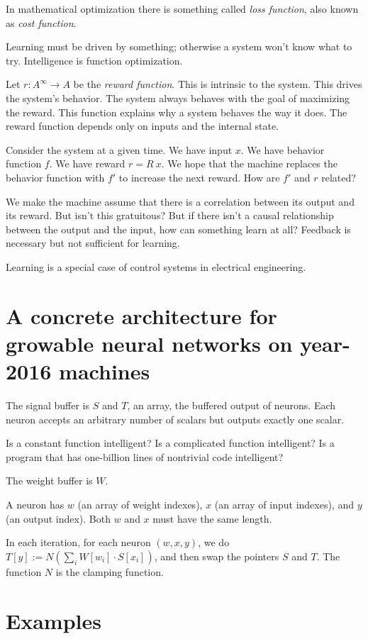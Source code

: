 In mathematical optimization there is something called
\emph{loss function}, also known as \emph{cost function}.

Learning must be driven by something;
otherwise a system won't know what to try.
Intelligence is function optimization.

Let \( r : A^\infty \to A \) be the \emph{reward function}.
This is intrinsic to the system.
This drives the system's behavior.
The system always behaves with the goal of maximizing the reward.
This function explains why a system behaves the way it does.
The reward function depends only on inputs and the internal state.

Consider the system at a given time.
We have input \(x\).
We have behavior function \(f\).
We have reward \(r = R~x\).
We hope that the machine
replaces the behavior function with \(f'\)
to increase the next reward.
How are \(f'\) and \(r\) related?

We make the machine assume that there is a correlation
between its output and its reward.
But isn't this gratuitous?
But if there isn't a causal relationship between the output and the input,
how can something learn at all?
Feedback is necessary but not sufficient for learning.

Learning is a special case of control systems in electrical engineering.

\section{A concrete architecture for growable neural networks on year-2016 machines}

The signal buffer is \(S\) and \(T\), an array, the buffered output of neurons.
Each neuron accepts an arbitrary number of scalars but outputs exactly one scalar.

Is a constant function intelligent? Is a complicated function intelligent?
Is a program that has one-billion lines of nontrivial code intelligent?

The weight buffer is \(W\).

A neuron has \(w\) (an array of weight indexes), \(x\) (an array of input indexes), and \(y\) (an output index).
Both \(w\) and \(x\) must have the same length.

In each iteration, for each neuron \((w,x,y)\),
we do \(T[y] := N \left( \sum_i W[w_i] \cdot S[x_i] \right) \),
and then swap the pointers \(S\) and \(T\).
The function \(N\) is the clamping function.

\section{Examples}

